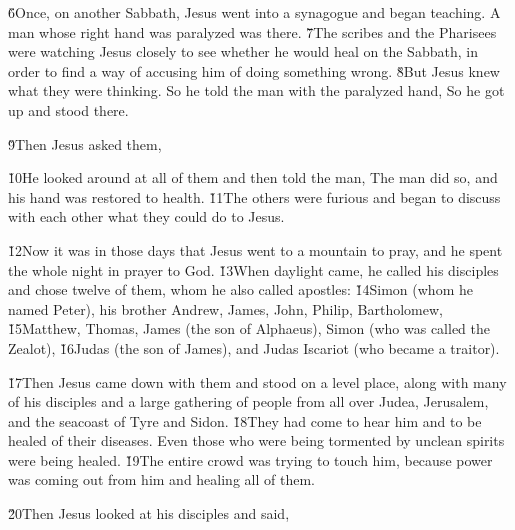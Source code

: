 \v{6}Once, on another Sabbath, Jesus went into a synagogue and began teaching. A man whose right hand was paralyzed was there. \v{7}The scribes and the Pharisees were watching Jesus closely to see whether he would heal on the Sabbath, in order to find a way of accusing him of doing something wrong. \v{8}But Jesus knew what they were thinking. So he told the man with the paralyzed hand,  So he got up and stood there.

\v{9}Then Jesus asked them, 

\v{10}He looked around at all of them and then told the man,  The man did so, and his hand was restored to health. \v{11}The others were furious and began to discuss with each other what they could do to Jesus.

\v{12}Now it was in those days that Jesus went to a mountain to pray, and he spent the whole night in prayer to God. \v{13}When daylight came, he called his disciples and chose twelve of them, whom he also called apostles: \v{14}Simon (whom he named Peter), his brother Andrew, James, John, Philip, Bartholomew, \v{15}Matthew, Thomas, James (the son of Alphaeus), Simon (who was called the Zealot), \v{16}Judas (the son of James), and Judas Iscariot (who became a traitor).

\v{17}Then Jesus came down with them and stood on a level place, along with many of his disciples and a large gathering of people from all over Judea, Jerusalem, and the seacoast of Tyre and Sidon. \v{18}They had come to hear him and to be healed of their diseases. Even those who were being tormented by unclean spirits were being healed. \v{19}The entire crowd was trying to touch him, because power was coming out from him and healing all of them.

\v{20}Then Jesus looked at his disciples and said,

